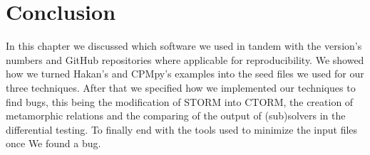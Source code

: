 

\section{Conclusion}
\label{impl:conclusion}
In this chapter we discussed which software we used in tandem with the version's numbers and GitHub repositories where applicable for reproducibility. We showed how we turned Hakan's and CPMpy's examples into the seed files we used for our three techniques. After that we specified how we implemented our techniques to find bugs, this being the modification of STORM into CTORM, the creation of metamorphic relations and the comparing of the output of (sub)solvers in the differential testing. To finally  end with the tools used to minimize the input files once We found a bug.


